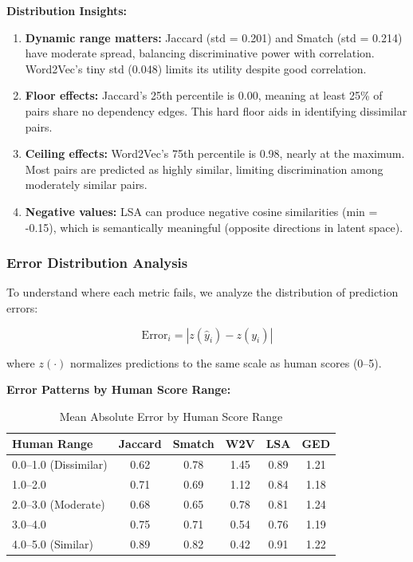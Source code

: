 \documentclass[11pt,a4paper]{article}
\begin{document}
\textbf{Distribution Insights:}

\begin{enumerate}
    \item \textbf{Dynamic range matters:} Jaccard (std = 0.201) and Smatch (std = 0.214) have moderate spread, balancing discriminative power with correlation. Word2Vec's tiny std (0.048) limits its utility despite good correlation.
    
    \item \textbf{Floor effects:} Jaccard's 25th percentile is 0.00, meaning at least 25\% of pairs share no dependency edges. This hard floor aids in identifying dissimilar pairs.
    
    \item \textbf{Ceiling effects:} Word2Vec's 75th percentile is 0.98, nearly at the maximum. Most pairs are predicted as highly similar, limiting discrimination among moderately similar pairs.
    
    \item \textbf{Negative values:} LSA can produce negative cosine similarities (min = -0.15), which is semantically meaningful (opposite directions in latent space).
\end{enumerate}

\subsubsection{Error Distribution Analysis}

To understand where each metric fails, we analyze the distribution of prediction errors:

\begin{equation}
\text{Error}_i = |z(\hat{y}_i) - z(y_i)|
\end{equation}

where $z(\cdot)$ normalizes predictions to the same scale as human scores (0--5).

\textbf{Error Patterns by Human Score Range:}

\begin{table}[h]
\centering
\caption{Mean Absolute Error by Human Score Range}
\begin{tabular}{lccccc}
\toprule
\textbf{Human Range} & \textbf{Jaccard} & \textbf{Smatch} & \textbf{W2V} & \textbf{LSA} & \textbf{GED} \\
\midrule
0.0--1.0 (Dissimilar) & 0.62 & 0.78 & 1.45 & 0.89 & 1.21 \\
1.0--2.0 & 0.71 & 0.69 & 1.12 & 0.84 & 1.18 \\
2.0--3.0 (Moderate) & 0.68 & 0.65 & 0.78 & 0.81 & 1.24 \\
3.0--4.0 & 0.75 & 0.71 & 0.54 & 0.76 & 1.19 \\
4.0--5.0 (Similar) & 0.89 & 0.82 & 0.42 & 0.91 & 1.22 \\
\bottomrule
\end{tabular}
\end{table}
\end{document}
